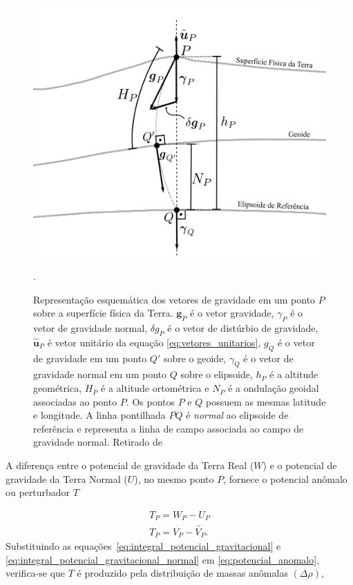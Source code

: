 \begin{figure}[H]
	\centering
	\includegraphics[scale=0.5]{figs/disturbio_de_gravidade.png}
	\caption{Representação esquemática dos vetores de gravidade em um ponto $P$ sobre a superfície física da Terra.	$\mathbf{g}_P$ é o vetor gravidade, $\gamma_{P}$ é o vetor de gravidade normal, $\delta g_{P}$ é o vetor de distúrbio de gravidade, $\mathbf{\hat{u}}_{P}$ é vetor unitário da equação \ref{eq:vetores_unitarios}, $g_{Q}$ é o vetor de gravidade em um ponto ${Q'}$ sobre o geoide, $\gamma_{Q}$ é o vetor de gravidade normal em um ponto ${Q}$ sobre o elipsoide, $h_{P}$ é a altitude geométrica, $H_{P}$ é a altitude ortométrica e $N_{P}$ é a ondulação geoidal associadas ao ponto ${P}$. Os pontos ${P}$ e ${Q}$ possuem as mesmas latitude e longitude. A linha pontilhada $\overline{PQ}$ é \textit{normal} ao elipsoide de referência e representa a linha de campo associada ao campo de gravidade normal. Retirado de }.
	\label{fig:disturbio}
\end{figure}

 

A diferença entre o potencial de gravidade da Terra Real ($W$) e o potencial de gravidade da Terra Normal ($U$), no mesmo ponto $P$, fornece o potencial anômalo ou perturbador $T$ \cite{escobar2000,hofmann2006} 

\begin{equation} \label{eq:potencial_anomalo}
\begin{gathered}
\displaystyle {T_{P} = W_{P} - U_{P}} \\
\displaystyle {T_{P} = V_{P} - \tilde{V_{P}} }.
\end{gathered}
\end{equation} Substituindo as equações~\ref{eq:integral_potencial_gravitacional} e \ref{eq:integral_potencial_gravitacional_normal} em \ref{eq:potencial_anomalo}, verifica-se que $T$ é produzido pela distribuição de massas anômalas $(\Delta \rho)$,


